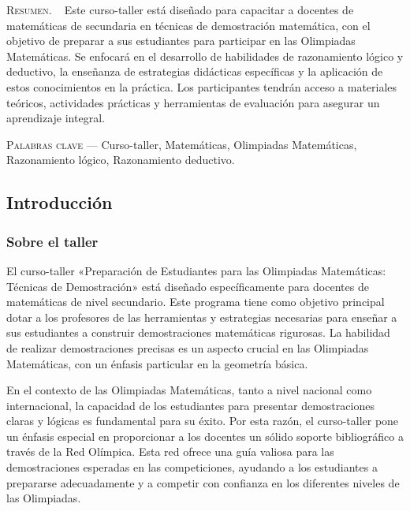\begin{center}
	\begin{minipage}{0.75\linewidth} \small
		\textsc{Resumen}. ~
		Este curso-taller está diseñado para capacitar a docentes de matemáticas de secundaria en técnicas de demostración matemática, con el objetivo de preparar a sus estudiantes para participar en las Olimpiadas Matemáticas. Se enfocará en el desarrollo de habilidades de razonamiento lógico y deductivo, la enseñanza de estrategias didácticas específicas y la aplicación de estos conocimientos en la práctica. Los participantes tendrán acceso a materiales teóricos, actividades prácticas y herramientas de evaluación para asegurar un aprendizaje integral.
	\end{minipage}
	
	\vspace{0.5em}
	
	\begin{minipage}{0.75\linewidth} \small
		\textsc{Palabras clave} --- Curso-taller, Matemáticas, Olimpiadas Matemáticas, Razonamiento lógico, Razonamiento deductivo.
	\end{minipage}
\end{center}

\subsection{Introducción}

\subsubsection{Sobre el taller}

El curso-taller «Preparación de Estudiantes para las Olimpiadas Matemáticas: Técnicas de Demostración» está diseñado específicamente para docentes de matemáticas de nivel secundario. Este programa tiene como objetivo principal dotar a los profesores de las herramientas y estrategias necesarias para enseñar a sus estudiantes a construir demostraciones matemáticas rigurosas. La habilidad de realizar demostraciones precisas es un aspecto crucial en las Olimpiadas Matemáticas, con un énfasis particular en la geometría básica.

En el contexto de las Olimpiadas Matemáticas, tanto a nivel nacional como internacional, la capacidad de los estudiantes para presentar demostraciones claras y lógicas es fundamental para su éxito. Por esta razón, el curso-taller pone un énfasis especial en proporcionar a los docentes un sólido soporte bibliográfico a través de la Red Olímpica. Esta red ofrece una guía valiosa para las demostraciones esperadas en las competiciones, ayudando a los estudiantes a prepararse adecuadamente y a competir con confianza en los diferentes niveles de las Olimpiadas.

